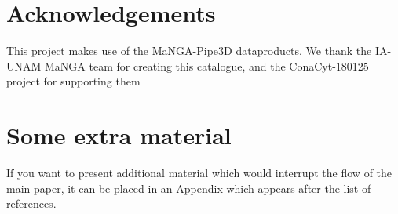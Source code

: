 \documentclass[fleqn,usenatbib]{mnras}
\begin{document}




\section*{Acknowledgements}
This project makes use of the MaNGA-Pipe3D dataproducts. We thank the IA-UNAM MaNGA team for creating this catalogue, and the ConaCyt-180125 project for supporting them

\appendix

\section{Some extra material}

If you want to present additional material which would interrupt the flow of the main paper,
it can be placed in an Appendix which appears after the list of references.



\bsp	%
\label{lastpage}
\end{document}
